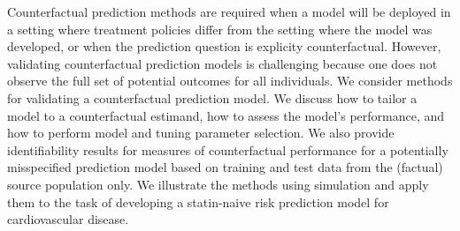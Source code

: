 


Counterfactual prediction methods are required when a model will be deployed in a setting where treatment policies differ from the setting where the model was developed, or when the prediction question is explicity counterfactual. However, validating counterfactual prediction models is challenging because one does not observe the full set of potential outcomes for all individuals. We consider methods for validating a counterfactual prediction model. We discuss how to tailor a model to a counterfactual estimand, how to assess the model's performance, and how to perform model and tuning parameter selection. We also provide identifiability results for measures of counterfactual performance for a potentially misspecified prediction model based on training and test data from the (factual) source population only. We illustrate the methods using simulation and apply them to the task of developing a statin-naive risk prediction model for cardiovascular disease. \\
